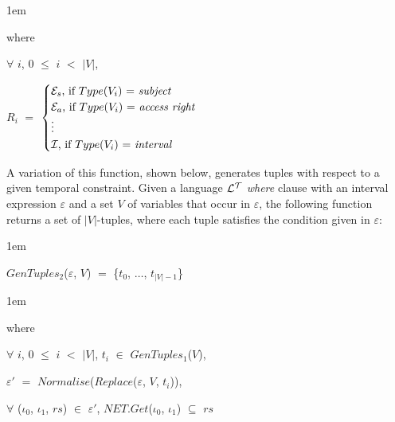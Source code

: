 \documentclass[11pt]{report}
\newenvironment{vquote}
{
  \begin{list}{}{\leftmargin 1em}\item[]
}
{
  \end{list}
}
\begin{document}
\begin{itemize}
              \begin{vquote}
                where

                \hspace{1em}
                $\forall$ $i$, $0$ $\leq$ $i$ $<$ $|V|$,

                \hspace{1em}
                $R_i$ $=$
                \begin{math}
                  \begin{cases}
                    \mbox{${\cal E}_s$, if $Type$($V_i$) $=$ {\em subject}} \\
                    \mbox{${\cal E}_a$, if $Type$($V_i$) $=$ {\em access right}} \\
                    \vdots \\
                    \mbox{${\cal I}$, if $Type$($V_i$) $=$ {\em interval}}
                  \end{cases}
                \end{math}
              \end{vquote}

              A variation of this function, shown below, generates tuples
              with respect to a given temporal constraint. Given a language
              ${\cal L^T}$ {\em where} clause with an interval expression
              $\varepsilon$ and a set $V$ of variables that occur in
              $\varepsilon$, the following function returns a set of
              $|V|$-tuples, where each tuple satisfies the condition given
              in $\varepsilon$:

              \begin{vquote}
                $GenTuples_2$($\varepsilon$, $V$)
                $=$ \{$t_0$, $\ldots$, $t_{|V|-1}$\}
              \end{vquote}

              \begin{vquote}
                where

                \hspace{1em}
                $\forall$ $i$, $0$ $\leq$ $i$ $<$ $|V|$,
                $t_i$ $\in$ $GenTuples_1$($V$),

                \hspace{1em}
                $\varepsilon'$ $=$
                $Normalise$($Replace$($\varepsilon$, $V$, $t_i$)),

                \hspace{1em}
                $\forall$ (${\iota}_0$, ${\iota}_1$, $rs$) $\in$
                $\varepsilon'$,
                $NET.Get$(${\iota}_0$, ${\iota}_1$) $\subseteq$ $rs$
              \end{vquote}


\end{itemize}
\end{document}
